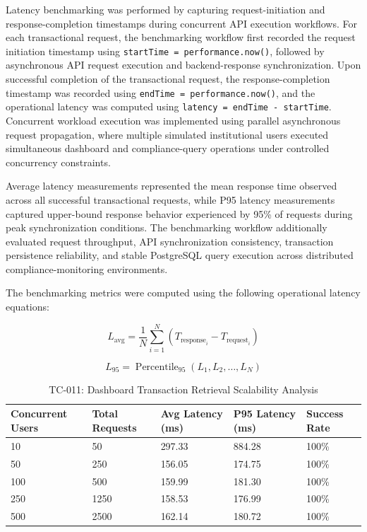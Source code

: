 Latency benchmarking was performed by capturing request-initiation and response-completion timestamps during concurrent API execution workflows. For each transactional request, the benchmarking workflow first recorded the request initiation timestamp using \texttt{startTime = performance.now()}, followed by asynchronous API request execution and backend-response synchronization. Upon successful completion of the transactional request, the response-completion timestamp was recorded using \texttt{endTime = performance.now()}, and the operational latency was computed using \texttt{latency = endTime - startTime}. Concurrent workload execution was implemented using parallel asynchronous request propagation, where multiple simulated institutional users executed simultaneous dashboard and compliance-query operations under controlled concurrency constraints.

Average latency measurements represented the mean response time observed across all successful transactional requests, while P95 latency measurements captured upper-bound response behavior experienced by 95\% of requests during peak synchronization conditions. The benchmarking workflow additionally evaluated request throughput, API synchronization consistency, transaction persistence reliability, and stable PostgreSQL query execution across distributed compliance-monitoring environments.

The benchmarking metrics were computed using the following operational latency equations:

\begin{equation}
L_{\text{avg}} =
\frac{1}{N}
\sum_{i=1}^{N}
(T_{\text{response}_i} - T_{\text{request}_i})
\end{equation}

\begin{equation}
L_{95} =
\operatorname{Percentile}_{95}(L_1, L_2, \dots, L_N)
\end{equation}

\renewcommand{\arraystretch}{1.3}

\begin{table}[H]
\centering
\caption{TC-011: Dashboard Transaction Retrieval Scalability Analysis}
\label{tab:dashboard_transaction_retrieval_scalability_test}
\vspace{0.2cm}

\begin{tabular}{|p{2.6cm}|p{2.4cm}|p{2.8cm}|p{2.8cm}|p{2.2cm}|}
\hline
\textbf{Concurrent Users} & \textbf{Total Requests} & \textbf{Avg Latency (ms)} & \textbf{P95 Latency (ms)} & \textbf{Success Rate} \\ \hline
10 & 50 & 297.33 & 884.28 & 100\% \\ \hline
50 & 250 & 156.05 & 174.75 & 100\% \\ \hline
100 & 500 & 159.99 & 181.30 & 100\% \\ \hline
250 & 1250 & 158.53 & 176.99 & 100\% \\ \hline
500 & 2500 & 162.14 & 180.72 & 100\% \\ \hline
\end{tabular}
\end{table}

